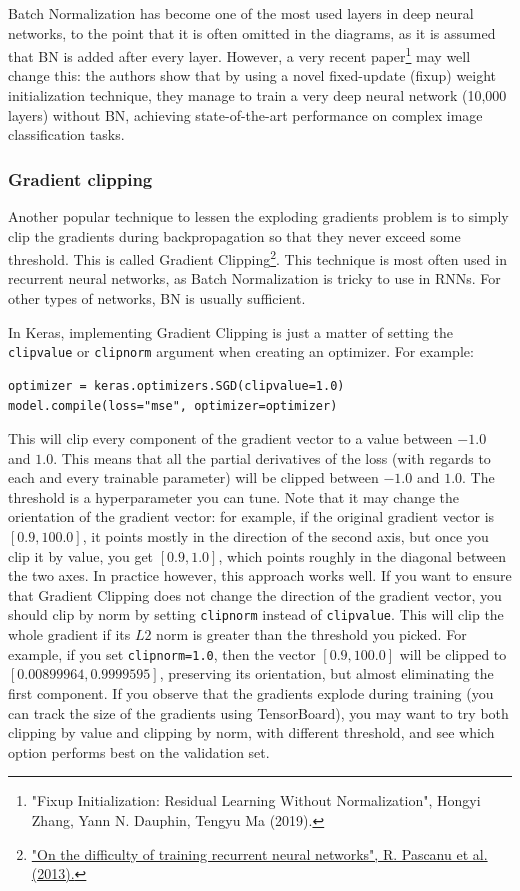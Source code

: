 \documentclass[12pt, letterpaper]{article}
\theoremstyle{definition}
\let\cd\lstinline
\begin{document}
Batch Normalization has become one of the most used layers in deep neural networks, to the point that it is often omitted in the diagrams, as it is assumed that BN is added after every layer. However, a very recent paper\footnote{"Fixup Initialization: Residual Learning Without Normalization", Hongyi Zhang, Yann N. Dauphin, Tengyu Ma (2019).} may well change this: the authors show that by using a novel fixed-update (fixup) weight initialization technique, they manage to train a very deep neural network (10,000 layers) without BN, achieving state-of-the-art performance on complex image classification tasks.

\subsubsection{Gradient clipping}
Another popular technique to lessen the exploding gradients problem is to simply clip the gradients during backpropagation so that they never exceed some threshold. This is called Gradient Clipping\footnote{\href{https://homl.info/52}{"On the difficulty of training recurrent neural networks", R. Pascanu et al. (2013).}}. This technique is most often used in recurrent neural networks, as Batch Normalization is tricky to use in RNNs. For other types of networks, BN is usually sufficient.

In Keras, implementing Gradient Clipping is just a matter of setting the \cd+clipvalue+ or \cd+clipnorm+ argument when creating an optimizer. For example:
\begin{lstlisting}
optimizer = keras.optimizers.SGD(clipvalue=1.0)
model.compile(loss="mse", optimizer=optimizer)
\end{lstlisting}
This will clip every component of the gradient vector to a value between $-1.0$ and $1.0$. This means that all the partial derivatives of the loss (with regards to each and every trainable parameter) will be clipped between $-1.0$ and $1.0$. The threshold is a hyperparameter you can tune. Note that it may change the orientation of the gradient vector: for example, if the original gradient vector is $[0.9, 100.0]$, it points mostly in the direction of the second axis, but once you clip it by value, you get $[0.9, 1.0]$, which points roughly in the diagonal between the two axes. In practice however, this approach works well. If you want to ensure that Gradient Clipping does not change the direction of the gradient vector, you should clip by norm by setting \cd+clipnorm+ instead of \cd+clipvalue+. This will clip the whole gradient if its $L2$ norm is greater than the threshold you picked. For example, if you set \cd+clipnorm=1.0+, then the vector $[0.9, 100.0]$ will be clipped to $[0.00899964, 0.9999595]$, preserving its orientation, but almost eliminating the first component. If you observe that the gradients explode during training (you can track the size of the gradients using TensorBoard), you may want to try both clipping by value and clipping by norm, with different threshold, and see which option performs best on the validation set.
\end{document}
